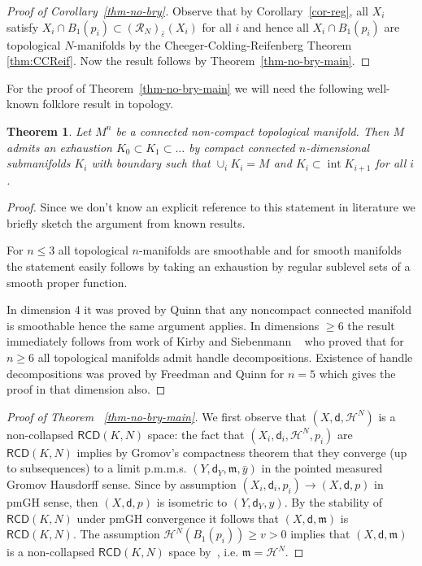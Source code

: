 \documentclass[a4paper]{amsart}
\newcounter{assu}
\theoremstyle{plain}
\newtheorem{theorem}[lemma]{Theorem}
\theoremstyle{definition}
\numberwithin{equation}{section}
\newcommand{\RCD}{\mathsf{RCD}}
\newcommand{\mm}{\mathfrak m}
\newcommand{\sfd}{\mathsf d}
\newcommand{\cR}{\mathcal{R}}
\newcommand{\cH}{\mathcal{H}}
\newcommand{\beps}{\bar \varepsilon}
\DeclareMathOperator{\intr}{int}
\begin{document}
{{\begin{proof}[Proof of Corollary~\ref{thm-no-bry}]
Observe that by Corollary~\ref{cor-reg}, all $X_i$ satisfy $X_i\cap B_1(p_i)\subset (\cR_{N})_{\beps}(X_i)$ for all $i$ and hence all   $X_i\cap B_1(p_i)$ are topological $N$-manifolds by the Cheeger-Colding-Reifenberg Theorem \ref{thm:CCReif}. Now the result follows by Theorem~\ref{thm-no-bry-main}.
\end{proof}



For the proof of Theorem~\ref{thm-no-bry-main}  we will need the following well-known folklore result in topology.

\begin{theorem}\label{thn-comp-exhaustion}
Let $M^n$ be a  connected non-compact topological manifold. Then $M$ admits an exhaustion  $K_0\subset K_1\subset\ldots$
by compact connected $n$-dimensional submanifolds  $K_i$ with boundary such that $\cup_i K_i=M$ and $K_i\subset \intr K_{i+1}$ for all $i$.
\end{theorem}
\begin{proof}
Since we don't know an explicit reference to this statement in literature we briefly sketch the argument from known results.

For $n\le 3$ all topological $n$-manifolds are smoothable and for smooth manifolds the statement easily follows by taking an exhaustion by regular sublevel sets of a smooth proper function.

In dimension $4$ it was proved by Quinn that any noncompact connected manifold is smoothable \cite{QuinnIII} hence the same argument applies.
In dimensions $\ge 6$ the result immediately follows from work of Kirby and Siebenmann ~\cite{KS} who proved that for $n\ge 6$ all topological manifolds admit handle decompositions.
Existence of handle decompositions was proved by Freedman and Quinn \cite{QuinnIII} for $n=5$ which gives the proof in that dimension also.
\end{proof}

\begin{proof}[Proof of Theorem ~\ref{thm-no-bry-main}]
We first observe that $(X,\sfd,\cH^{N})$ is a non-collapsed $\RCD(K,N)$ space: the fact that $(X_{i},\sfd_{i},\cH^{N},p_{i})$ are $\RCD(K,N)$ implies by Gromov's compactness theorem that they converge (up to subsequences) to a limit p.m.m.s. $(Y,\sfd_{Y},\mm,\bar{y})$ in the pointed measured Gromov Hausdorff sense. Since by assumption $(X_{i},\sfd_{i},p_{i}) \to (X,\sfd, p)$ in pmGH sense, then $(X,\sfd, p)$ is isometric to $(Y,\sfd_{Y},y)$.  By the stability of $\RCD(K,N)$ under pmGH convergence \cite{lottvillani:metric, sturm:II, Vil, AGS, GMS2013} it follows that  $(X,\sfd,\mm)$ is  $\RCD(K,N)$. The  assumption $\cH^{N}(B_1(p_i))\ge v>0$ implies that $(X,\sfd,\mm)$ is  a non-collapsed $\RCD(K,N)$ space by~\cite[Theorem 1.2]{GDPNonColl}, i.e. $\mm=\cH^{N}$.



\end{proof}}}
\end{document}
